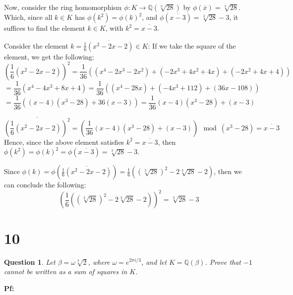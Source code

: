 \documentclass{article}
\newtheorem{question}{Question}
\begin{document}
\hfil

Now, consider the ring homomorphism $\phi:K\rightarrow\mathbb{Q}(\sqrt[3]{28})$ by $\phi(\overline{x})=\sqrt[3]{28}$. Which, since all $k\in K$ has $\phi(k^2)=\phi(k)^2$,
and $\phi(\overline{x-3})=\sqrt[3]{28}-3$, it suffices to find the element $k\in K$, with $k^2=\overline{x-3}$.

\hfil

Consider the element $k=\overline{\frac{1}{6}(x^2-2x-2)}\in K$: If we take the square of the element, we get the following:
$$\left(\frac{1}{6}(x^2-2x-2)\right)^2=\frac{1}{36}((x^4-2x^3-2x^2)+(-2x^3+4x^2+4x)+(-2x^2+4x+4))$$
$$=\frac{1}{36}(x^4-4x^3+8x+4)=\frac{1}{36}((x^4-28x)+(-4x^3+112)+(36x-108))$$
$$=\frac{1}{36}((x-4)(x^3-28)+36(x-3)) = \frac{1}{36}(x-4)(x^3-28)+(x-3)$$

$$\overline{\left(\frac{1}{6}(x^2-2x-2)\right)^2}=\left(\frac{1}{36}(x-4)(x^3-28)+(x-3)\right)\mod (x^3-28) = \overline{x-3}$$
Hence, since the above element satisfies $k^2=\overline{x-3}$, then $\phi(k^2)=\phi(k)^2=\phi(\overline{x-3})=\sqrt[3]{28}-3$.

Since $\phi(k)=\phi(\overline{\frac{1}{6}(x^2-2x-2)})=\frac{1}{6}((\sqrt[3]{28})^2-2\sqrt[3]{28}-2)$, then we can conclude the following:
$$\left(\frac{1}{6}((\sqrt[3]{28})^2-2\sqrt[3]{28}-2)\right)^2=\sqrt[3]{28}-3$$



\break

\section*{10}
\begin{myBox}[]{}
    \begin{question}
        Let $\beta=\omega \sqrt[3]{2}$, where $\omega=e^{2\pi i/3}$, and let $K=\mathbb{Q}(\beta)$. 
        Prove that $-1$ cannot be written as a sum of squares in $K$.
    \end{question}
\end{myBox}

\textbf{Pf:}
\end{document}

